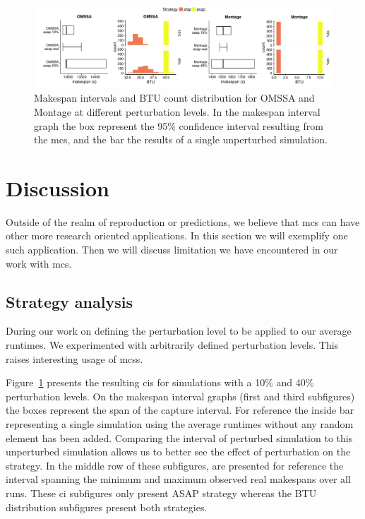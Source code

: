 \documentclass[10pt,conference,compsocconf]{IEEEtran}
\begin{document}
\begin{figure}
	\includegraphics[width=\textwidth]{gfx/int_plot.pdf}
	\caption{Makespan intervals and BTU count distribution for OMSSA and 
	Montage at different perturbation levels. In the makespan interval graph 
	the box represent the 95\% confidence interval resulting from the \acs{mcs},
	and the bar the results of a single unperturbed simulation.}\label{fig:int}
\end{figure}


\section{Discussion}

Outside of the realm of reproduction or predictions, we believe that \ac{mcs}
can have other more research oriented applications. In this section we will
exemplify one such application. Then we will discuss limitation we have
encountered in our work with \ac{mcs}.

\subsection{Strategy analysis}\label{sec:sa}
During our work on defining the perturbation level to be applied to our average
runtimes. We experimented with arbitrarily defined perturbation levels. This
raises interesting usage of \acp{mcs}.

Figure~\ref{fig:int} presents the resulting \acp{ci} for simulations with a 10\%
and 40\% perturbation levels. On the makespan interval graphs (first and third
subfigures) the boxes represent the span of the capture interval. For reference
the inside bar representing a single simulation using the average runtimes
without any random element has been added.  Comparing the interval of perturbed
simulation to this unperturbed simulation allows us to better see the effect of
perturbation on the strategy. In the middle row of these subfigures, are
presented for reference the interval spanning the minimum and maximum observed
real makespans over all runs. These \ac{ci} subfigures only present ASAP
strategy whereas the BTU distribution subfigures  present both strategies.
\end{document}
